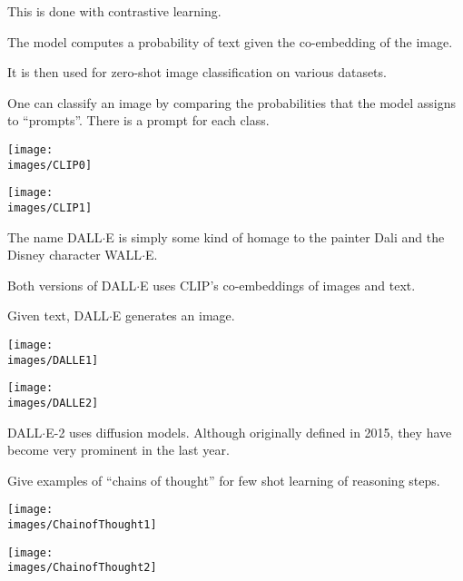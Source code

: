 {\vfill
This is done with contrastive learning.


The model computes a probability of text given the co-embedding of the image.

\vfill
It is then used for zero-shot image classification on various datasets.

\vfill
One can classify an image by comparing the probabilities that the model assigns to ``prompts''.  There is a prompt for each class.


\centerline{\texttt{[image: \\images/CLIP0]}}


\centerline{\texttt{[image: \\images/CLIP1]}}



The name DALL$\cdot$E is simply some kind of homage to the painter Dali and the Disney character WALL$\cdot$E.

\vfill
Both versions of DALL$\cdot$E uses CLIP's co-embeddings of images and text.

\vfill
Given text, DALL$\cdot$E generates an image.


\centerline{\texttt{[image: \\images/DALLE1]}}


\centerline{\texttt{[image: \\images/DALLE2]}}


DALL$\cdot$E-2 uses diffusion models.  Although originally defined in 2015, they have become very prominent in the last year.


Give examples of ``chains of thought'' for few shot learning of reasoning steps.


\centerline{\texttt{[image: \\images/ChainofThought1]}}


\centerline{\texttt{[image: \\images/ChainofThought2]}}


}
